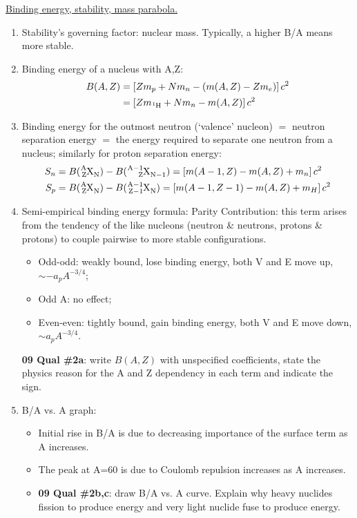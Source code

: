 \documentclass{school-22.101-notes}
\begin{document}
\clearpage

\uline{Binding energy, stability, mass parabola.}
\begin{enumerate}
\item Stability's governing factor: nuclear mass. Typically, a higher B/A means more stable.
\item Binding energy of a nucleus with A,Z:
\begin{align} 
B(A,Z) &= \left[ Z m_p + N m_n - (m(A,Z) - Z m_e) \right] c^2 \\
&= \left[ Z m_{\ce{^1 H}} + N m_n - m(A,Z) \right] c^2
\end{align}
\item Binding energy for the outmost neutron (`valence' nucleon) $=$ neutron separation energy $=$ the energy required to separate one neutron from a nucleus; similarly for proton separation energy: 
\begin{align}
S_n &= B(\ce{^A_Z X_N}) -B(\ce{^{A-1}_Z X_{N-1}}) = \left[ m(A-1, Z) - m(A,Z) + m_n \right] c^2 \\
S_p &= B(\ce{^A_Z X_N}) -B(\ce{^{A-1}_{Z-1} X_{N}}) = \left[ m(A-1, Z-1) - m(A,Z) + m_{H} \right] c^2
\end{align}
\item Semi-empirical binding energy formula:
    Parity Contribution: this term arises from the tendency of the like nucleons (neutron \& neutrons, protons \& protons) to couple pairwise to more stable configurations.
    \begin{itemize}
    \item Odd-odd: weakly bound, lose binding energy, both V and E move up, $\sim -a_p A^{-3/4}$;
    \item Odd A: no effect;
    \item Even-even: tightly bound, gain binding energy, both V and E move down, $\sim a_p A^{-3/4}$.
    \end{itemize}
    \textbf{09 Qual \#2a}: write $B(A,Z)$ with unspecified coefficients, state the physics reason for the A and Z dependency in each term and indicate the sign.  

\item B/A vs. A graph: 
  \begin{itemize}
  \item Initial rise in B/A is due to decreasing importance of the surface term as A increases. 
  \item The peak at A=60 is due to Coulomb repulsion increases as A increases. 
  \item \textbf{09 Qual \#2b,c}: draw B/A vs. A curve. Explain why heavy nuclides fission to produce energy and very light nuclide fuse to produce energy.   
 \end{itemize}


\end{enumerate}
\end{document}
